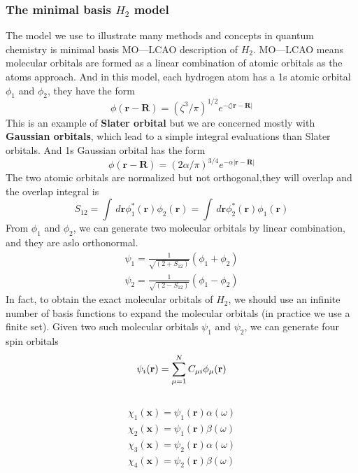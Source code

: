 \documentclass[11pt]{article}
\begin{document}
\subsubsection{The minimal basis $H_2$ model}
The model we use to illustrate many methods and concepts in quantum chemistry is minimal basis
MO—LCAO description of $H_2$. MO—LCAO means molecular orbitals are formed as a linear combination of 
atomic orbitals as the atoms approach. And in this model, each hydrogen atom has a 1s atomic orbital $\phi_1$
and $\phi_2$, they have the form
\begin{equation}
    \phi(\mathbf{r}-\mathbf{R})={(\zeta^3/\pi)}^{1/2}e^{-\zeta|\mathbf{r}-\mathbf{R}|}
\end{equation}
This is an example of \textbf{Slater orbital} but we are concerned mostly with \textbf{Gaussian orbitals}, which lead to 
a simple integral evaluations than Slater orbitals. And 1s Gaussian orbital has the form
\begin{equation}
    \phi(\mathbf{r}-\mathbf{R})={(2\alpha/\pi)}^{3/4}e^{-\alpha|\mathbf{r}-\mathbf{R}|}
\end{equation}
The two atomic orbitals are normalized but not orthogonal,they will overlap and the overlap integral
is
\begin{equation}
    S_{12}=\int\,d\mathbf{r}\phi_1^*(\mathbf{r})\phi_2(\mathbf{r})=\int\,d\mathbf{r}\phi_2^*(\mathbf{r})\phi_1(\mathbf{r})
\end{equation}
From $\phi_1$ and $\phi_2$, we can generate two molecular orbitals by linear combination, and they are aslo
orthonormal.
\begin{align}
    \psi_1=\frac{1}{\sqrt{(2+S_{12})}}(\phi_1+\phi_2)\\
    \psi_2=\frac{1}{\sqrt{(2-S_{12})}}(\phi_1-\phi_2)
\end{align}
In fact, to obtain the exact molecular orbitals of $H_2$, we should use an infinite number of basis functions to expand
the molecular orbitals (in practice we use a finite set). Given two such molecular orbitals $\psi_1$ and $\psi_2$, we can
generate four spin orbitals
\begin{equation}
    \psi_i(\mathbf{r})=\sum_{\mu=1}^{N}C_{\mu i}\phi_\mu(\mathbf{r})\\
\end{equation}\
\begin{equation}
    \begin{split}
        \chi_1(\mathbf{x})=\psi_1({\mathbf{r}})\alpha(\omega)\\
        \chi_2(\mathbf{x})=\psi_1({\mathbf{r}})\beta(\omega)\\
        \chi_3(\mathbf{x})=\psi_2({\mathbf{r}})\alpha(\omega)\\
        \chi_4(\mathbf{x})=\psi_2({\mathbf{r}})\beta(\omega)
    \end{split}
\end{equation}
\end{document}
